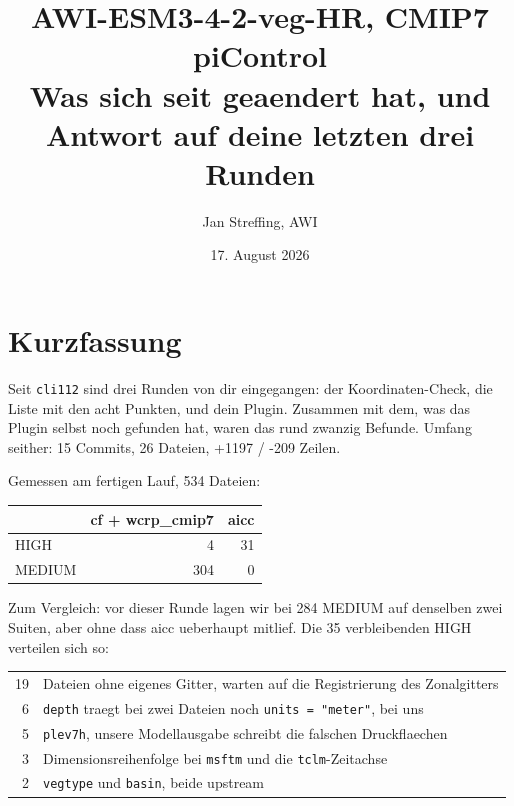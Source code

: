 \documentclass[11pt,a4paper]{article}
\title{AWI-ESM3-4-2-veg-HR, CMIP7 piControl\\[2mm]
\large Was sich seit \code{cli112} geaendert hat, und Antwort auf deine letzten drei Runden}
\author{Jan Streffing, AWI}
\date{17. August 2026}
\newcommand{\code}[1]{\texttt{\small #1}}
\begin{document}
\maketitle

\section{Kurzfassung}

Seit \code{cli112} sind drei Runden von dir eingegangen: der Koordinaten-Check, die
Liste mit den acht Punkten, und dein Plugin. Zusammen mit dem, was das Plugin selbst
noch gefunden hat, waren das rund zwanzig Befunde. Umfang seither: 15 Commits,
26 Dateien, +1197 / -209 Zeilen.

Gemessen am fertigen Lauf, 534 Dateien:

\begin{center}
\begin{tabular}{lrr}
\toprule
& \textbf{cf + wcrp\_cmip7} & \textbf{aicc} \\
\midrule
HIGH   &   4 & 31 \\
MEDIUM & 304 &  0 \\
\bottomrule
\end{tabular}
\end{center}

Zum Vergleich: vor dieser Runde lagen wir bei 284 MEDIUM auf denselben zwei
Suiten, aber ohne dass aicc ueberhaupt mitlief. Die 35 verbleibenden HIGH
verteilen sich so:

\begin{center}
\begin{tabular}{rl}
\toprule
19 & Dateien ohne eigenes Gitter, warten auf die Registrierung des Zonalgitters \\
 6 & \code{depth} traegt bei zwei Dateien noch \code{units = "meter"}, bei uns \\
 5 & \code{plev7h}, unsere Modellausgabe schreibt die falschen Druckflaechen \\
 3 & Dimensionsreihenfolge bei \code{msftm} und die \code{tclm}-Zeitachse \\
 2 & \code{vegtype} und \code{basin}, beide upstream \\
\bottomrule
\end{tabular}
\end{center}
\end{document}
